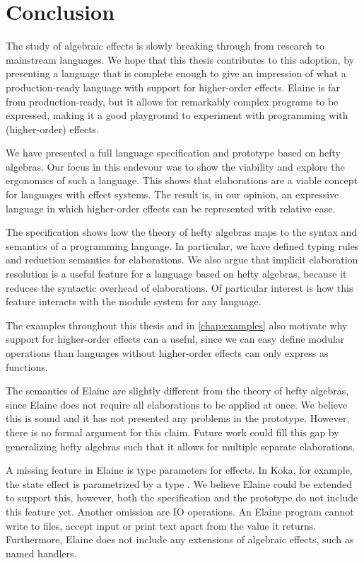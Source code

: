 \chapter{Conclusion}

The study of algebraic effects is slowly breaking through from research to mainstream languages. We hope that this thesis contributes to this adoption, by presenting a language that is complete enough to give an impression of what a production-ready language with support for higher-order effects. Elaine is far from production-ready, but it allows for remarkably complex programs to be expressed, making it a good playground to experiment with programming with (higher-order) effects.

We have presented a full language specification and prototype based on hefty algebras. Our focus in this endevour was to show the viability and explore the ergonomics of such a language. This shows that elaborations are a viable concept for languages with effect systems. The result is, in our opinion, an expressive language in which higher-order effects can be represented with relative ease.

The specification shows how the theory of hefty algebras maps to the syntax and semantics of a programming language. In particular, we have defined typing rules and reduction semantics for elaborations. We also argue that implicit elaboration resolution is a useful feature for a language based on hefty algebras, because it reduces the syntactic overhead of elaborations. Of particular interest is how this feature interacts with the module system for any language.

The examples throughout this thesis and in \cref{chap:examples} also motivate why support for higher-order effects can a useful, since we can easy define modular operations than languages without higher-order effects can only express as functions.

The semantics of Elaine are slightly different from the theory of hefty algebras, since Elaine does not require all elaborations to be applied at once. We believe this is sound and it has not presented any problems in the prototype. However, there is no formal argument for this claim. Future work could fill this gap by generalizing hefty algebras such that it allows for multiple separate elaborations.

A missing feature in Elaine is type parameters for effects. In Koka, for example, the state effect  is parametrized by a type . We believe Elaine could be extended to support this, however, both the specification and the prototype do not include this feature yet. Another omission are IO operations. An Elaine program cannot write to files, accept input or print text apart from the value it returns. Furthermore, Elaine does not include any extensions of algebraic effects, such as named handlers.

